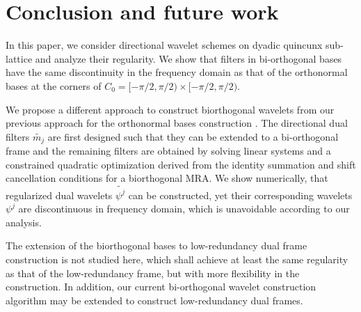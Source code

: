 \section{Conclusion and future work}\label{sec: end}
In this paper, we consider directional wavelet schemes on dyadic quincunx sub-lattice and analyze their regularity. We show that filters in bi-orthogonal bases have the same discontinuity in the frequency domain as that of the orthonormal bases at the corners of $C_0 = [-\pi/2,\pi/2)\times[-\pi/2,\pi/2)$. 

 We propose a different approach to construct biorthogonal wavelets from our previous approach for the orthonormal bases construction \cite{yin2014orthshear}. The directional dual filters $\widetilde{m_j}$ are first designed such that they can be extended to a bi-orthogonal frame and the remaining filters are obtained by solving linear systems and a constrained quadratic optimization derived from the identity summation and shift cancellation conditions for a biorthogonal MRA. We show numerically, that regularized dual wavelets $\widetilde{\psi^j}$ can be constructed, yet their corresponding wavelets $\psi^j$ are discontinuous in frequency domain, which is unavoidable according to our analysis.

The extension of the biorthogonal bases to low-redundancy dual frame construction is not studied here, which shall achieve at least the same regularity as that of the low-redundancy frame, but with more flexibility in the construction. In addition, our current bi-orthogonal wavelet construction algorithm may be extended to construct low-redundancy dual frames.